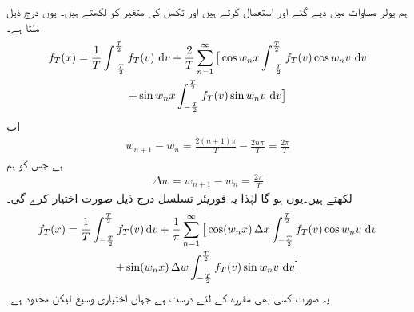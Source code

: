 ہم یولر مساوات  میں دیے گئے  اور  استعمال کرتے ہیں اور تکمل کی متغیر کو  لکھتے ہیں۔ یوں درج ذیل ملتا ہے۔
\begin{multline*}
f_T(x)=\frac{1}{T}\int_{-\frac{T}{2}}^{\frac{T}{2}} f_T(v)\,\dif v+\frac{2}{T}\sum\limits_{n=1}^{\infty}\big[\cos w_nx\int_{-\frac{T}{2}}^{\frac{T}{2}}f_T(v)\cos w_nv\,\dif v\\
+\sin w_nx\int_{-\frac{T}{2}}^{\frac{T}{2}}f_T(v)\sin w_nv\,\dif v\big]
\end{multline*}
اب
\begin{align*}
w_{n+1}-w_n=\frac{2(n+1)\pi}{T}-\frac{2n\pi}{T}=\frac{2\pi}{T}
\end{align*}
ہے  جس کو ہم 
\begin{align*}
\Delta w=w_{n+1}-w_n=\frac{2\pi}{T}
\end{align*}
لکھتے ہیں۔یوں  ہو گا لہٰذا یہ فوریئر تسلسل  درج ذیل صورت اختیار کرے گی۔
\begin{multline}\label{مساوات_فوریئر_تکمل_الف}
f_T(x)=\frac{1}{T}\int_{-\frac{T}{2}}^{\frac{T}{2}} f_T(v)\dif v+\frac{1}{\pi}\sum\limits_{n=1}^{\infty}\big[ \cos(w_n x)\,\Delta x\int_{-\frac{T}{2}}^{\frac{T}{2}}f_T(v)\cos w_nv\,\dif v\\
+\sin (w_nx)\,\Delta w\int_{-\frac{T}{2}}^{\frac{T}{2}}f_T(v)\sin w_nv\,\dif v\big]
\end{multline}
یہ صورت کسی بھی مقررہ  کے لئے درست ہے جہاں  اختیاری وسیع لیکن محدود ہے۔


